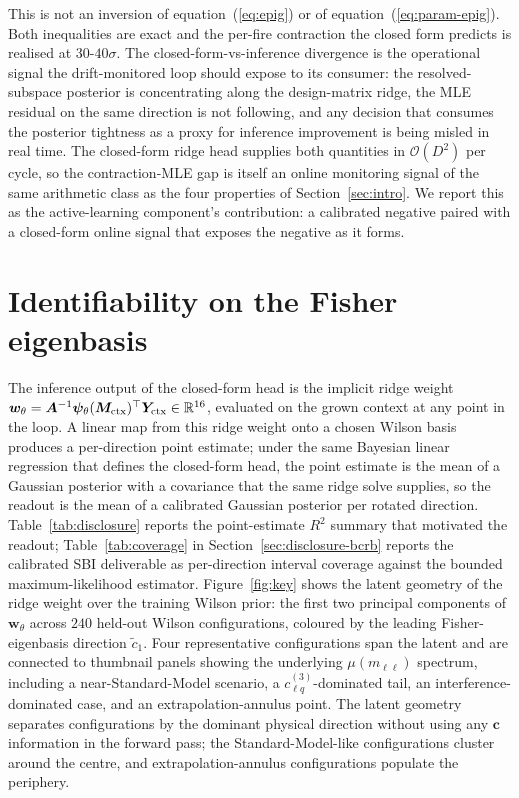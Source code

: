 \documentclass[11pt,a4paper]{article}
\newcommand{\mll}{m_{\ell\ell}}
\newcommand{\Ainv}{\bm{A}^{-1}}
\newcommand{\psib}{\bm{\psi}}
\begin{document}
This is not an inversion of equation~(\ref{eq:epig}) or of equation~(\ref{eq:param-epig}). Both inequalities are exact and the per-fire contraction the closed form predicts is realised at $30$-$40\sigma$. The closed-form-vs-inference divergence is the operational signal the drift-monitored loop should expose to its consumer: the resolved-subspace posterior is concentrating along the design-matrix ridge, the MLE residual on the same direction is not following, and any decision that consumes the posterior tightness as a proxy for inference improvement is being misled in real time. The closed-form ridge head supplies both quantities in $\mathcal{O}(D^2)$ per cycle, so the contraction-MLE gap is itself an online monitoring signal of the same arithmetic class as the four properties of Section~\ref{sec:intro}. We report this as the active-learning component's contribution: a calibrated negative paired with a closed-form online signal that exposes the negative as it forms.

\section{Identifiability on the Fisher eigenbasis}
\label{sec:disclosure}

The inference output of the closed-form head is the implicit ridge weight $\bm{w}_\theta = \Ainv \psib_\theta(\bm{M}_{\rm ctx})^\top \bm{Y}_{\rm ctx} \in \mathbb{R}^{16}$, evaluated on the grown context at any point in the loop. A linear map from this ridge weight onto a chosen Wilson basis produces a per-direction point estimate; under the same Bayesian linear regression that defines the closed-form head, the point estimate is the mean of a Gaussian posterior with a covariance that the same ridge solve supplies, so the readout is the mean of a calibrated Gaussian posterior per rotated direction. Table~\ref{tab:disclosure} reports the point-estimate $R^2$ summary that motivated the readout; Table~\ref{tab:coverage} in Section~\ref{sec:disclosure-bcrb} reports the calibrated SBI deliverable as per-direction interval coverage against the bounded maximum-likelihood estimator. Figure~\ref{fig:key} shows the latent geometry of the ridge weight over the training Wilson prior: the first two principal components of $\bm{w}_\theta$ across $240$ held-out Wilson configurations, coloured by the leading Fisher-eigenbasis direction $\tilde c_1$. Four representative configurations span the latent and are connected to thumbnail panels showing the underlying $\mu(\mll)$ spectrum, including a near-Standard-Model scenario, a $c_{\ell q}^{(3)}$-dominated tail, an interference-dominated case, and an extrapolation-annulus point. The latent geometry separates configurations by the dominant physical direction without using any $\bm{c}$ information in the forward pass; the Standard-Model-like configurations cluster around the centre, and extrapolation-annulus configurations populate the periphery.
\end{document}
